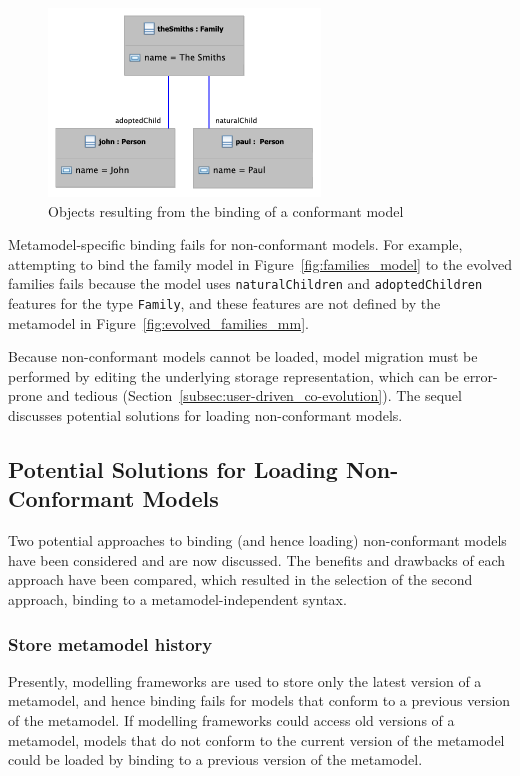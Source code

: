 \begin{figure}[htbp]
  \centering
  \includegraphics[height=5cm]{5.Implementation/images/successful_binding.pdf}
  \caption{Objects resulting from the binding of a conformant model}
  \label{fig:successful_binding}
\end{figure}

Metamodel-specific binding fails for non-conformant models. For example, attempting to bind the family model in Figure~\ref{fig:families_model} to the evolved families fails because the model uses \texttt{na\-tu\-r\-alCh\-il\-dr\-en} and \texttt{ad\-op\-t\-edCh\-il\-dr\-en} features for the type \texttt{Fa\-mi\-ly}, and these features are not defined by the metamodel in Figure~\ref{fig:evolved_families_mm}.

Because non-conformant models cannot be loaded, model migration must be performed by editing the underlying storage representation, which can be error-prone and tedious (Section~\ref{subsec:user-driven_co-evolution}). The sequel discusses potential solutions for loading non-conformant models.

\subsection{Potential Solutions for Loading Non-Conformant Models}
Two potential approaches to binding (and hence loading) non-conformant models have been considered and are now discussed. The benefits and drawbacks of each approach have been compared, which resulted in the selection of the second approach, binding to a metamodel-independent syntax.

\subsubsection{Store metamodel history}
Presently, modelling frameworks are used to store only the latest version of a metamodel, and hence binding fails for models that conform to a previous version of the metamodel. If modelling frameworks could access old versions of a metamodel, models that do not conform to the current version of the metamodel could be loaded by binding to a previous version of the metamodel.

